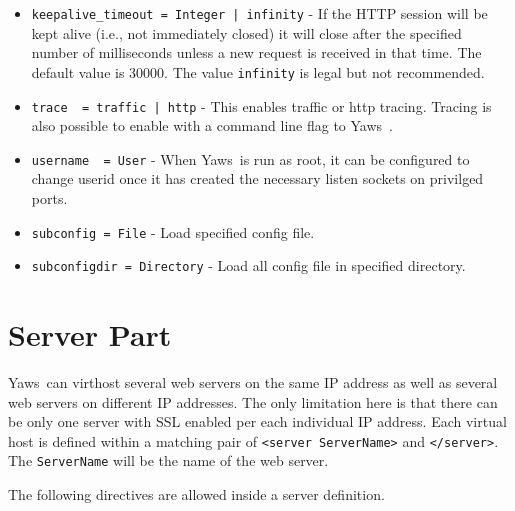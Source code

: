 \documentclass[11pt,oneside,english]{book}
\newcommand{\Yaws}            %
        {{\sc Yaws}}
\begin{document}
\begin{itemize}
\item        \verb+keepalive_timeout = Integer | infinity+ -
              If the HTTP session will be kept alive (i.e., not
              immediately closed) it will close after the specified
              number of milliseconds unless a new request is received
              in that time. The default value is 30000. The value
              \verb+infinity+ is legal but not recommended.

\item        \verb+trace  = traffic | http+ -
              This  enables  traffic  or http tracing. Tracing is
              also possible to enable with a command line flag to
              \Yaws\ .

\item        \verb+username  = User+ -
             When \Yaws\  is run as root, it can be configured to
             change userid once it has created the necessary
             listen sockets on privilged ports.

\item        \verb+subconfig = File+ -
             Load specified config file.

\item        \verb+subconfigdir = Directory+ -
             Load all config file in specified directory.

\end{itemize}



\section{Server Part}

\Yaws\ can virthost several web servers on the same IP address as well
as several web servers on different IP addresses.  The only limitation
here is that there can be only one server with SSL enabled per each
individual IP address.  Each virtual host is defined within a matching
pair of \verb+<server ServerName>+ and \verb+</server>+.  The
\verb+ServerName+ will be the name of the web server.

The following directives are allowed inside a server definition.
\end{document}
